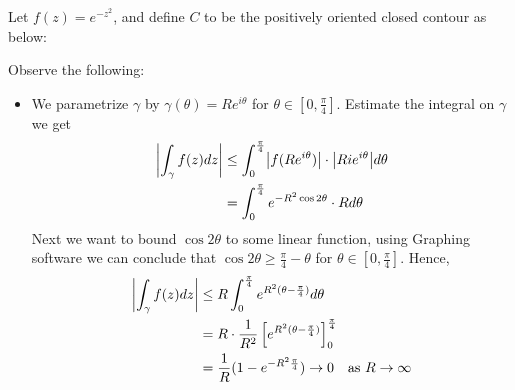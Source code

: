 \begin{solution}
	Let $f(z)=e^{-z^2}$, and define $C$ to be the positively oriented closed contour
  as below:
  \begin{center}
  \end{center}
  Observe the following:
  \begin{itemize}
  \item We parametrize $\gamma$ by $\gamma(\theta)=Re^{i\theta}$ for $\theta\in[0,\frac{\pi}{4}]$.
    Estimate the integral on $\gamma$ we get
    \begin{align*}
      \abs*{\int_{\gamma}f(z)dz}
      &\leq \int_{0}^{\frac{\pi}{4}} \abs*{f(Re^{i\theta})}\cdot \abs*{Rie^{i\theta}}d\theta\\
      &=\int_0^{\frac{\pi}{4}}e^{-R^2\cos2\theta}\cdot Rd\theta
    \end{align*}
    Next we want to bound $\cos 2\theta$ to some linear function, using Graphing software
    we can conclude that
    $\cos2\theta\geq \frac{\pi}{4}-\theta$ for $\theta\in[0,\frac{\pi}{4}]$.
    Hence,
    \begin{align*}
      \abs*{\int_{\gamma}f(z)dz}
      &\leq R\int_{0}^{\frac\pi 4}e^{R^2 (\theta-\frac\pi 4)}d\theta\\
      &=R\cdot\frac1{R^2}\left[e^{R^2 (\theta-\frac\pi 4)}\right]_{0}^{\frac\pi 4}\\
      &=\frac1{R}(1-e^{-R^2\frac\pi 4})\to 0\quad \text{as } R\to\infty
    \end{align*}


\end{itemize}
\end{solution}
